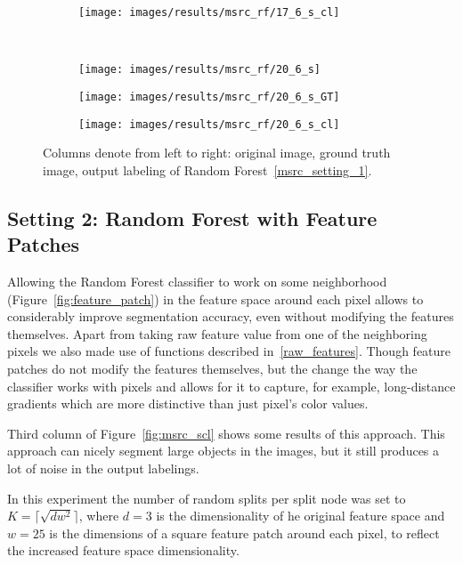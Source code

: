 \begin{figure}[t]
\begin{subfigure}[c]{0.24\textwidth}
  \centering
  \texttt{[image: images/results/msrc\_rf/17\_6\_s\_cl]}
 \end{subfigure}
 \\
 \begin{subfigure}[c]{0.24\textwidth}
  \centering
  \texttt{[image: images/results/msrc\_rf/20\_6\_s]}
 \end{subfigure}
 \begin{subfigure}[c]{0.24\textwidth}
  \centering
  \texttt{[image: images/results/msrc\_rf/20\_6\_s\_GT]}
 \end{subfigure}
 \begin{subfigure}[c]{0.24\textwidth}
  \centering
  \texttt{[image: images/results/msrc\_rf/20\_6\_s\_cl]}
 \end{subfigure}
 \caption{Columns denote from left to right: original image, ground truth image, output labeling of Random Forest~\ref{msrc_setting_1}.}\label{fig:msrc_rf}
\end{figure}


\subsection{Setting 2: Random Forest with Feature Patches}
\label{msrc_setting_2}

Allowing the Random Forest classifier to work on some neighborhood (Figure~\ref{fig:feature_patch}) in the feature space around each pixel 
allows to considerably improve segmentation
accuracy, even without modifying the features themselves. Apart from taking raw feature value from one of the neighboring pixels we also made use
of functions described in~\ref{raw_features}. Though feature patches do not modify the features themselves, but the change the way the 
classifier works with pixels and allows for it to capture,
for example, long-distance gradients which are more distinctive than just pixel's color values.

Third column of Figure~\ref{fig:msrc_scl} shows some results of this approach. This approach can nicely segment large objects in the images,
but it still produces a lot of noise in the output labelings.

In this experiment the number of random splits per split node was set to 
$K = \lceil\sqrt{d w^2}\rceil$, where $d = 3$ is the dimensionality of he original feature space and $w = 25$ is the dimensions of a square
feature patch around each pixel, to reflect the increased feature space dimensionality.

